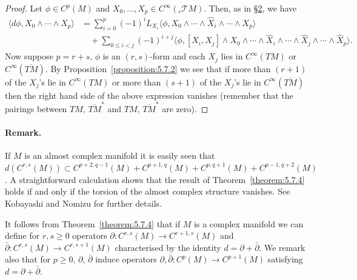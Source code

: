 \begin{proof}
Let $\phi\in C^p(M)$ and $X_0,\ldots,X_p\in C^\infty({}_c\mathcal TM)$. Then, as in \hyperref[sec:5:2]{\S2}, we have
\[
\begin{split}
\langle d\phi,X_0\wedge\cdots\wedge X_p\rangle
&=\sum_{i=0}^p(-1)^iL_{X_i}\langle\phi,X_0\wedge\cdots\wedge\widehat X_i\wedge\cdots\wedge X_p\rangle\\
&\quad+\sum_{0\leq i<j}(-1)^{i+j}\langle\phi,[X_i,X_j]\wedge X_0\wedge\cdots\wedge\widehat X_i\wedge\cdots\wedge\widehat X_j\wedge\cdots\wedge\widehat X_p\rangle.
\end{split}
\]
Now suppose $p=r+s$, $\phi$ is an $(r,s)$-form and each $X_j$ lies in $C^\infty(TM)$ or $C^\infty(\overline{TM})$. By Proposition~\ref{proposition:5.7.2} we see that if more than $(r+1)$ of the $X_j$'s lie in $C^\infty(TM)$ or more than $(s+1)$ of the $X_j$'s lie in $C^\infty(\overline{TM})$ then the right hand side of the above expression vanishes (remember that the pairings between $TM$, $\overline{TM}^*$ and $TM$, $\overline{TM}^*$ are zero).
\end{proof}
\paragraph{Remark.} If $M$ is an almost complex manifold it is easily seen that $d(C^{r,s}(M))\subset C^{p+2,q-1}(M)+C^{p+1,q}(M)+C^{p,q+1}(M)+C^{p-1,q+2}(M)$. A straightforward calculation shows that the result of Theorem~\ref{theorem:5.7.4} holds if and only if the torsion of the almost complex structure vanishes. See Kobayashi and Nomizu \cite{bib:II:kobayashi-s-and-nomizu-k:2} for further details.

It follows from Theorem~\ref{theorem:5.7.4} that if $M$ is a complex manifold we can define for $r,s\geq0$ operators $\partial:C^{r,s}(M)\to C^{r+1,s}(M)$ and $\bar\partial:C^{r,s}(M)\to C^{r,s+1}(M)$ characterised by the identity $d=\partial+\bar\partial$. We remark also that for $p\geq0$, $\partial$, $\bar\partial$ induce operators $\partial,\bar\partial:C^p(M)\to C^{p+1}(M)$ satisfying $d=\partial+\bar\partial$.
